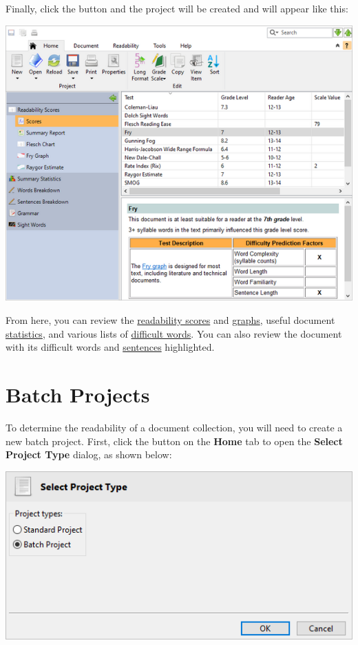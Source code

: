 \documentclass[
]{book}
\theoremstyle{definition}
\theoremstyle{definition}
\theoremstyle{definition}
\theoremstyle{definition}
\theoremstyle{remark}
\begin{document}
Finally, click the  button and the project will be created and will appear like this:

\includegraphics{Images/scores.png}

From here, you can review the \protect\hyperlink{reviewing-test-scores}{readability scores} and \protect\hyperlink{reviewing-readability-graphs}{graphs}, useful document \protect\hyperlink{reviewing-statistics}{statistics}, and various lists of \protect\hyperlink{reviewing-word-breakdowns}{difficult words}. You can also review the document with its difficult words and \protect\hyperlink{reviewing-standard-grammar}{sentences} highlighted.

\hypertarget{creating-batch-project}{%
\section{Batch Projects}\label{creating-batch-project}}

To determine the readability of a document collection, you will need to create a new batch project. First, click the  button on the \textbf{Home} tab to open the \textbf{Select Project Type} dialog, as shown below:

\begin{center}\includegraphics[width=0.75\linewidth,]{Images/selectprojecttype} \end{center}
\end{document}
